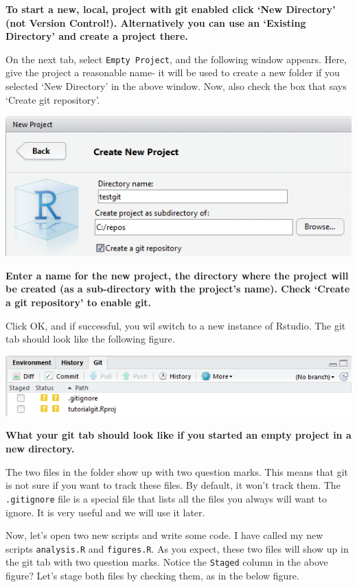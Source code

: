 \documentclass[]{book}
\begin{document}
\textbf{To start a new, local, project with git enabled click `New Directory' (not Version Control!). Alternatively you can use an `Existing Directory' and create a project there.}

On the next tab, select \texttt{Empty\ Project}, and the following window appears. Here, give the project a reasonable name- it will be used to create a new folder if you selected `New Directory' in the above window. Now, also check the box that says `Create git repository'.

\includegraphics[width=0.75\linewidth]{screenshots/gitnewproject}

\textbf{Enter a name for the new project, the directory where the project will be created (as a sub-directory with the project's name). Check `Create a git repository' to enable git.}

Click OK, and if successful, you wil switch to a new instance of Rstudio. The git tab should look like the following figure.

\includegraphics[width=0.75\linewidth]{screenshots/gittabnewproject}

\textbf{What your git tab should look like if you started an empty project in a new directory.}

The two files in the folder show up with two question marks. This means that git is not sure if you want to track these files. By default, it won't track them. The \texttt{.gitignore} file is a special file that lists all the files you always will want to ignore. It is very useful and we will use it later.

Now, let's open two new scripts and write some code. I have called my new scripts \texttt{analysis.R} and \texttt{figures.R}. As you expect, these two files will show up in the git tab with two question marks. Notice the \texttt{Staged} column in the above figure? Let's stage both files by checking them, as in the below figure.
\end{document}

